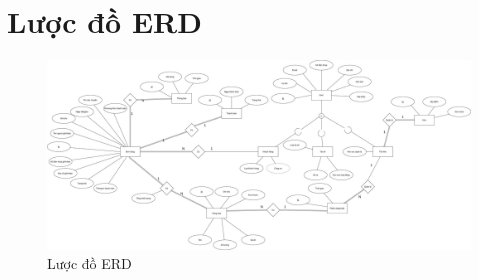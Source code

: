 \chapter{Lược đồ ERD}\label{chap:ERD}
	\begin{figure}[H]
		\includegraphics[width=1\textwidth]{Images/erd.jpg}
		\centering
		\linebreak
		\caption{Lược đồ ERD}
	\end{figure}